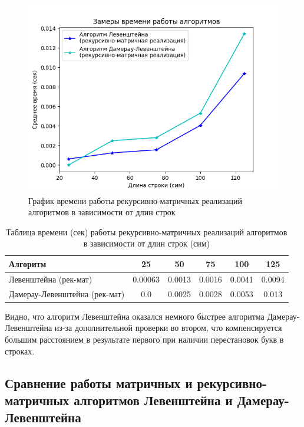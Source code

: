 \begin{figure}[H]
    \centering
    \includegraphics[width=1\textwidth]{img/graph_rec-mat.png}
    \caption{График времени работы рекурсивно-матричных реализаций алгоритмов в зависимости от длин строк}
    \label{fig:graph_rec-mat}
\end{figure}

\begin{table}[H]
    \centering
    \begin{tabular}{|l|c|c|c|c|c|}
        \hline
        \textbf{Алгоритм} & \textbf{25} & \textbf{50} & \textbf{75} & \textbf{100} & \textbf{125}\\
        \hline
        Левенштейна (рек-мат) & 0.00063 & 0.0013 & 0.0016 & 0.0041 & 0.0094 \\
        Дамерау-Левенштейна (рек-мат) & 0.0 & 0.0025 & 0.0028 & 0.0053 & 0.013  \\
        \hline
    \end{tabular}
    \caption{Таблица времени (сек) работы рекурсивно-матричных реализаций алгоритмов в зависимости от длин строк (сим)}
    \label{table:table_rec-mat}
\end{table}

Видно, что алгоритм Левенштейна оказался немного быстрее алгоритма Дамерау-Левенштейна из-за дополнительной проверки во втором, что компенсируется большим расстоянием в результате первого при наличии перестановок букв в строках.

\subsection{Сравнение работы матричных и рекурсивно-матричных алгоритмов Левенштейна и Дамерау-Левенштейна}

